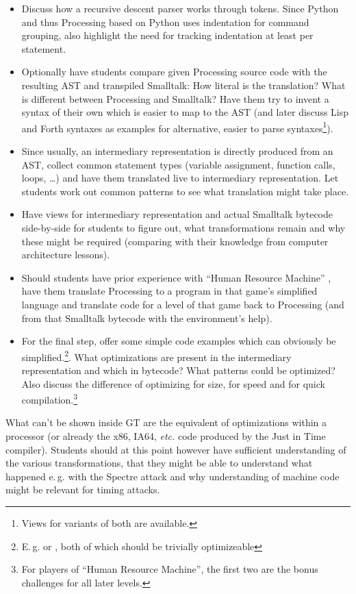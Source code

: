 \begin{instructions}
\begin{itemize}
\item Discuss how a recursive descent parser works through tokens. Since Python and thus Processing based on Python uses indentation for command grouping, also highlight the need for tracking indentation at least per statement.
\item Optionally have students compare given Processing source code with the resulting \ac{AST} and transpiled Smalltalk: How literal is the translation? What is different between Processing and Smalltalk? Have them try to invent a syntax of their own which is easier to map to the \ac{AST} (and later discuss Lisp and Forth syntaxes as examples for alternative, easier to parse syntaxes\footnote{Views for variants of both are available.}).
\item Since usually, an intermediary representation is directly produced from an \ac{AST}, collect common statement types (variable assignment, function calls, loops, \dots) and have them translated live to intermediary representation. Let students work out common patterns to see what translation might take place.
\item Have views for intermediary representation and actual Smalltalk bytecode side-by-side for students to figure out, what transformations remain and why these might be required (comparing with their knowledge from computer architecture lessons).
\item Should students have prior experience with ``Human Resource Machine'' \cite{Tom15}, have them translate Processing to a program in that game's simplified language and translate code for a level of that game back to Processing (and from that Smalltalk bytecode with the environment's help).
\item For the final step, offer some simple code examples which can obviously be simplified.\footnote{E.\,g.  or , both of which should be trivially optimizeable}. What optimizations are present in the intermediary representation and which in bytecode? What patterns could be optimized? Also discuss the difference of optimizing for size, for speed and for quick compilation.\footnote{For players of ``Human Resource Machine'', the first two are the bonus challenges for all later levels.}
\end{itemize}
\item What can't be shown inside \ac{GT} are the equivalent of optimizations within a processor (or already the x86, IA64, \emph{etc.} code produced by the Just in Time compiler). Students should at this point however have sufficient understanding of the various transformations, that they might be able to understand what happened e.\,g. with the Spectre attack \cite{Koc19} and why understanding of machine code might be relevant for timing attacks.
\end{instructions}



